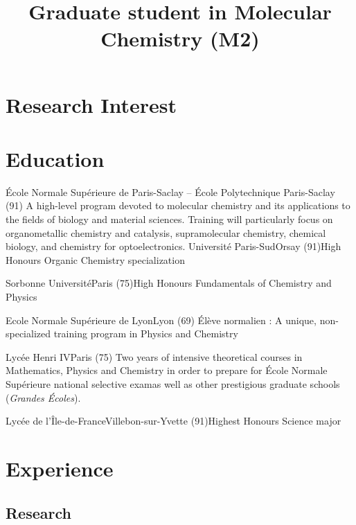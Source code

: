 \documentclass[11pt,a4paper,sans]{moderncv}
\title{Graduate student in Molecular Chemistry (M2)}
\begin{document}
\makecvtitle

%
\section{Research Interest}
%
%
\section{Education}
%
{{\newline}École Normale Supérieure de Paris-Saclay -- École Polytechnique}%
{Paris-Saclay (91)}{}%
{A high-level program devoted to molecular chemistry and its applications %
to the fields of biology and material sciences. %
Training will particularly focus on organometallic chemistry and catalysis, %
supramolecular chemistry, chemical biology, and chemistry for optoelectronics.%
}
%
\vspace{5mm}
%
%
{Université Paris-Sud}{Orsay (91)}{High Honours}%
{Organic Chemistry specialization}

%
{Sorbonne Université}{Paris (75)}{High Honours}%
{Fundamentals of Chemistry and Physics}

%
{Ecole Normale Supérieure de Lyon}{Lyon (69)}{}%
{Élève normalien : A unique, non-specialized training program in Physics and Chemistry}

%
{Lycée Henri IV}{Paris (75)}{}%
{Two years of intensive theoretical courses in Mathematics, Physics and Chemistry in order to prepare for École Normale Supérieure national selective examas well as other prestigious graduate schools (\emph{Grandes Écoles}).}

%
{Lycée de l'Île-de-France}{Villebon-sur-Yvette (91)}{Highest Honours}%
{Science major}
%

\section{Experience}
%

\subsection{Research}
\end{document}
